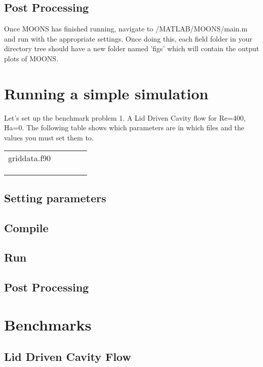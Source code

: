 \documentclass[11pt]{article}
\begin{document}
\subsection{Post Processing}
Once MOONS has finished running, navigate to /MATLAB/MOONS/main.m and run with the appropriate settings. Once doing this, each field folder in your directory tree should have a new folder named 'figs' which will contain the output plots of MOONS.


\section{Running a simple simulation}
Let's set up the benchmark problem 1. A Lid Driven Cavity flow for Re=400, Ha=0.
The following table shows which parameters are in which files and the values you must set them to.

\begin{table}[h]
\begin{tabular}{lllll}
griddata.f90 &  &  &  &  \\
 &  &  &  &  \\
 &  &  &  &  \\
 &  &  &  & 
\end{tabular}
\end{table}


\subsection{Setting parameters}

\subsection{Compile}

\subsection{Run}

\subsection{Post Processing}


\section{Benchmarks}

\subsection{Lid Driven Cavity Flow}
\end{document}
